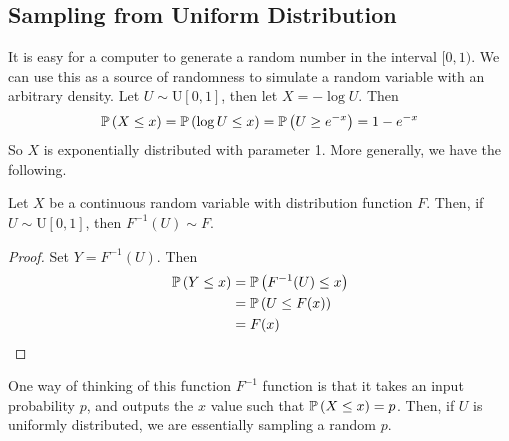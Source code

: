 \subsection{Sampling from Uniform Distribution}
It is easy for a computer to generate a random number in the interval $[0, 1)$. We can use this as a source of randomness to simulate a random variable with an arbitrary density. Let $U \sim \mathrm{U}[0, 1]$, then let $X = -\log U$. Then
\[ \mathbb{P}\left({X \leq x}\right) = \mathbb{P}\left({\log U \leq x}\right) = \mathbb{P}\left({U \geq e^{-x}}\right) = 1-e^{-x} \]
So $X$ is exponentially distributed with parameter 1. More generally, we have the following.
\begin{theorem}
	Let $X$ be a continuous random variable with distribution function $F$. Then, if $U \sim \mathrm{U}[0, 1]$, then $F^{-1}(U) \sim F$.
\end{theorem}
\begin{proof}
	Set $Y = F^{-1}(U)$. Then
	\begin{align*}
		\mathbb{P}\left({Y \leq x}\right) & = \mathbb{P}\left({F^{-1}(U) \leq x}\right) \\
		                & = \mathbb{P}\left({U \leq F(x)}\right)      \\
		                & = F(x)
	\end{align*}
\end{proof}
\noindent One way of thinking of this function $F^{-1}$ function is that it takes an input probability $p$, and outputs the $x$ value such that $\mathbb{P}\left({X \leq x}\right) = p$. Then, if $U$ is uniformly distributed, we are essentially sampling a random $p$.

